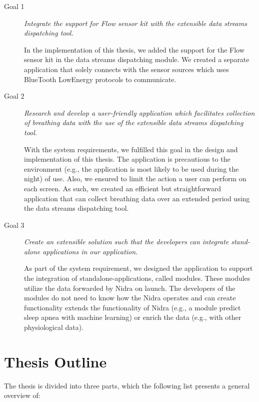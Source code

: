 \begin{description}
    \item[Goal 1] \textit{Integrate the support for Flow sensor kit with the extensible data streams dispatching tool.}
    
    In the implementation of this thesis, we added the support for the Flow sensor kit in the data streams dispatching module. We created a separate application that solely connects with the sensor sources which uses BlueTooth LowEnergy protocols to communicate.

    \item[Goal 2] \textit{Research and develop a user-friendly application which facilitates collection of breathing data with the use of the extensible data streams dispatching tool.}
    
    With the system requirements, we fulfilled this goal in the design and implementation of this thesis. The application is precautious to the environment (e.g., the application is most likely to be used during the night) of use. Also, we ensured to limit the action a user can perform on each screen. As such, we created an efficient but straightforward application that can collect breathing data over an extended period using the data streams dispatching tool. 
    
    \item[Goal 3] \textit{Create an extensible solution such that the developers can integrate stand-alone applications in our application.}

    As part of the system requirement, we designed the application to support the integration of standalone-applications, called modules. These modules utilize the data forwarded by Nidra on launch. The developers of the modules do not need to know how the Nidra operates and can create functionality extends the functionality of Nidra (e.g., a module predict sleep apnea with machine learning) or enrich the data (e.g., with other physiological data).   
\end{description}



\section{Thesis Outline}
The thesis is divided into three parts, which the following list presents a general overview of:

